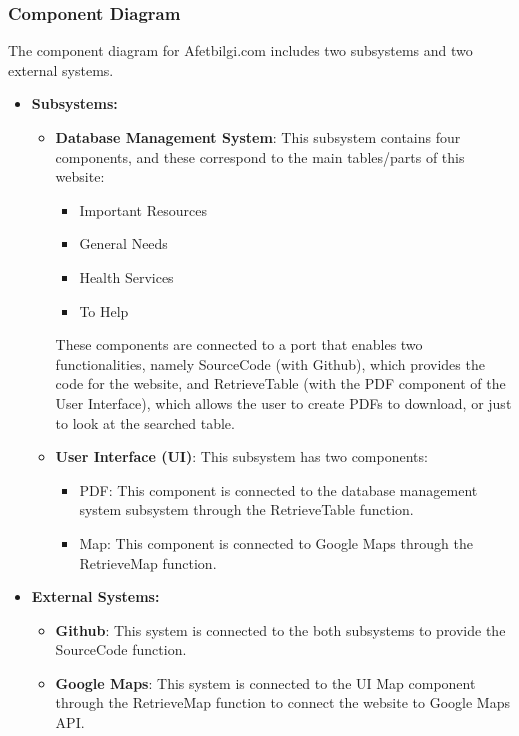 \documentclass[12pt, letterpaper]{article}
\begin{document}
\subsubsection{Component Diagram}

The component diagram for Afetbilgi.com includes two subsystems and two external systems. 

\begin{itemize}
    \item \textbf{Subsystems:}
    \begin{itemize}
        \item \textbf{Database Management System}: This subsystem contains four components, and these correspond to the main tables/parts of this website:
        \begin{itemize}
            \item Important Resources
            \item General Needs
            \item Health Services
            \item To Help
        \end{itemize}
        These components are connected to a port that enables two functionalities, namely SourceCode (with Github), which provides the code for the website, and RetrieveTable (with the PDF component of the User Interface), which allows the user to create PDFs to download, or just to look at the searched table.

        \item \textbf{User Interface (UI)}: This subsystem has two components:
        \begin{itemize}
            \item PDF: This component is connected to the database management system subsystem through the RetrieveTable function.
            \item Map: This component is connected to Google Maps through the RetrieveMap function.
        \end{itemize}
    \end{itemize}

    \item \textbf{External Systems:}
    \begin{itemize}
        \item \textbf{Github}: This system is connected to the both subsystems to provide the SourceCode function.
        \item \textbf{Google Maps}: This system is connected to the UI Map component through the RetrieveMap function to connect the website to Google Maps API.
    \end{itemize}
\end{itemize}
\end{document}
